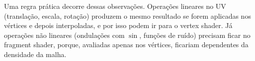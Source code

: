 Uma regra prática decorre dessas observações. Operações lineares no UV (translação, escala, rotação) produzem o mesmo resultado se forem aplicadas nos vértices e depois interpoladas, e por isso podem ir para o vertex shader. Já operações não lineares (ondulações com \(\sin\), funções de ruído) precisam ficar no fragment shader, porque, avaliadas apenas nos vértices, ficariam dependentes da densidade da malha.
